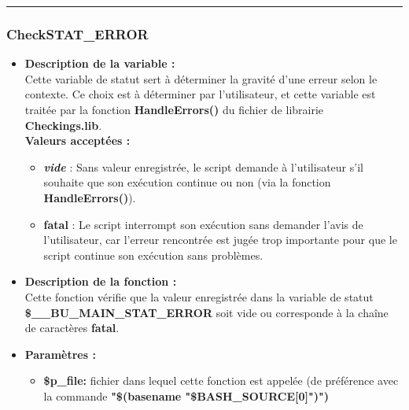 \documentclass[a4paper,10pt]{article}
\begin{document}
\color{blue}\par\noindent\rule{\textwidth}{0.4pt}\color{white}

\color{blue}
\subsubsection{CheckSTAT\_ERROR}\color{white}
\begin{itemize}
    \item \textbf{Description de la variable :}\\
    Cette variable de statut sert à déterminer la gravité d'une erreur selon le contexte. Ce choix est à déterminer par l'utilisateur, et cette variable est traitée par la fonction \textbf{\color{mauve}HandleErrors()} du fichier de librairie \textbf{\color{lime}Checkings.lib}.\\[1\baselineskip]

    \textbf{Valeurs acceptées :}
    \begin{itemize}
        \item \textbf{\textit{vide}} : Sans valeur enregistrée, le script demande à l'utilisateur s'il souhaite que son exécution
        continue ou non (via la fonction \textbf{\color{mauve}HandleErrors()}).\\[1\baselineskip]

        \item \textbf{fatal} : Le script interrompt son exécution sans demander l'avis de l'utilisateur, car l'erreur rencontrée est jugée trop importante pour que le script continue son exécution sans problèmes.\\[1\baselineskip]
    \end{itemize}

    \item \textbf{Description de la fonction :}\\
        Cette fonction vérifie que la valeur enregistrée dans la variable de statut \textbf{\color{orange}\$\_\_BU\_MAIN\_STAT\_ERROR} soit vide ou corresponde à la chaîne de caractères \textbf{fatal}.\\[1\baselineskip]

    \item \textbf{Paramètres :}
    \begin{itemize}
        \item \textbf{\color{orange}\$p\_file\color{white}:} fichier dans lequel cette fonction est appelée (de préférence avec la commande \textbf{\textbf{"\$(\color{gray}basename \color{white}"\color{orange}\$BASH\_SOURCE[0]\color{white}")")}}\\[1\baselineskip]


\end{itemize}
\end{itemize}
\end{document}
